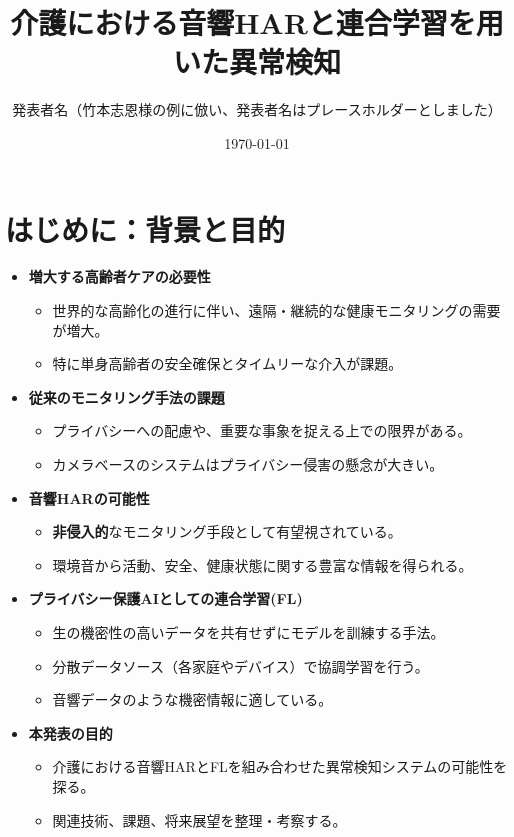 \documentclass[unicode,12pt,aspectratio=169, dvipdfmx]{beamer}
\title{介護における音響HARと連合学習を用いた異常検知}
\author{発表者名（竹本志恩様の例に倣い、発表者名はプレースホルダーとしました）}
\date{\today}
\institute{所属機関名（INIAD様の例に倣い、所属機関名はプレースホルダーとしました）}
\begin{document}
\frame{\maketitle}

\section{はじめに：背景と目的}
\begin{frame}{\insertsectionhead}
    \begin{itemize}
        \item \textbf{増大する高齢者ケアの必要性}
        \begin{itemize}
            \item 世界的な高齢化の進行に伴い、遠隔・継続的な健康モニタリングの需要が増大。
            \item 特に単身高齢者の安全確保とタイムリーな介入が課題。
        \end{itemize}
        \item \textbf{従来のモニタリング手法の課題}
        \begin{itemize}
            \item プライバシーへの配慮や、重要な事象を捉える上での限界がある。
            \item カメラベースのシステムはプライバシー侵害の懸念が大きい。
        \end{itemize}
        \item \textbf{音響HARの可能性}
        \begin{itemize}
            \item \textbf{非侵入的}なモニタリング手段として有望視されている。
            \item 環境音から活動、安全、健康状態に関する豊富な情報を得られる。
        \end{itemize}
        \item \textbf{プライバシー保護AIとしての連合学習(FL)}
        \begin{itemize}
            \item 生の機密性の高いデータを共有せずにモデルを訓練する手法。
            \item 分散データソース（各家庭やデバイス）で協調学習を行う。
            \item 音響データのような機密情報に適している。
        \end{itemize}
        \item \textbf{本発表の目的}
        \begin{itemize}
            \item 介護における音響HARとFLを組み合わせた異常検知システムの可能性を探る。
            \item 関連技術、課題、将来展望を整理・考察する。
        \end{itemize}
    \end{itemize}
\end{frame}
\end{document}
